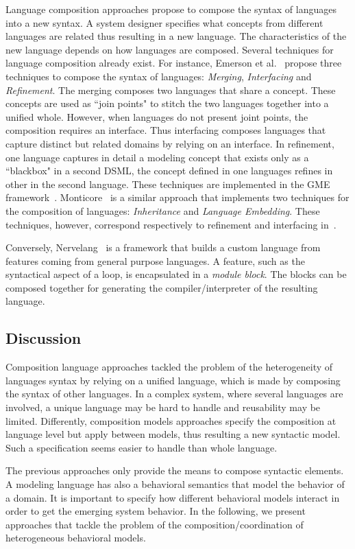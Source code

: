 Language composition approaches propose to compose the syntax of languages into a new syntax. A system designer specifies what concepts from different languages are related thus resulting in a new language. The characteristics of the new language depends on how languages are composed. Several techniques for language composition already exist. For instance, Emerson et al.~\cite{metamodelcompo} propose three techniques to compose the syntax of languages: \emph{Merging}, \emph{Interfacing} and \emph{Refinement}. The merging composes two languages that share a concept. These concepts are used as ``join points" to stitch the two languages together into a unified whole. However, when languages do not present joint points, the composition requires an interface. Thus interfacing composes languages that capture distinct but related domains by relying on an interface. In refinement, one language captures in detail a modeling concept that exists only as a ``blackbox" in a second DSML, \ie the concept defined in one languages refines in other in the second language. These techniques are implemented in the GME framework~\cite{metamodelcompo}. Monticore~\cite{monticore} is a similar approach that implements two techniques for the composition of languages: \emph{Inheritance} and \emph{Language Embedding}. These techniques, however, correspond respectively to refinement and interfacing in~\cite{metamodelcompo}.
	
Conversely, Nervelang~\cite{neverlang} is a framework that builds a custom language from features coming from general purpose languages. A feature, such as the syntactical aspect of a loop, is encapsulated in a \emph{module block}. The blocks can be composed together for generating the compiler/interpreter of the resulting language.  
	
	 	
\subsection{Discussion}
Composition language approaches tackled the problem of the heterogeneity of languages syntax by relying on a unified language, which is made by composing the syntax of other languages. In a complex system, where several languages are involved, a unique language may be hard to handle and reusability may be limited. Differently, composition models approaches specify the composition at language level but apply between models, thus resulting a new syntactic model. Such a specification seems easier to handle than whole language. 
			 	
The previous approaches only provide the means to compose syntactic elements. A modeling language has also a behavioral semantics that model the behavior of a domain. It is important to specify how different behavioral models interact in order to get the emerging system behavior. In the following, we present approaches that tackle the problem of the composition/coordination of heterogeneous behavioral models. 
